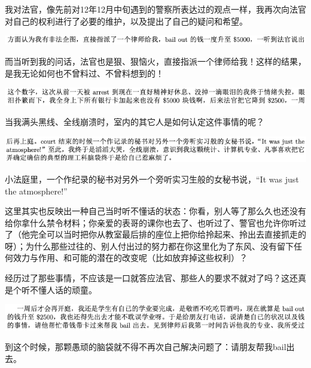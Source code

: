 \documentclass[9pt, b5paper]{article}
\begin{document}
我对法官，像先前对12年12月中旬遇到的警察所表达过的观点一样，我再次向法官对自己的权利进行了必要的维护，以及提出了自己的疑问和希望。

\begin{center}
\includegraphics[width=.9\linewidth]{./pic/backups_plans_20210506_084809.png}
\end{center}

而当听到我的问话，法官也是狠、狠恼火，直接指派一个律师给我！这样的结果，是我无论如何也不曾料过、不曾料想到的！

\begin{center}
\includegraphics[width=.9\linewidth]{./pic/backups_plans_20210506_084845.png}
\end{center}

当我满头黑线、全线崩溃时，室内的其它人是如何认定这件事情的呢？

\begin{center}
\includegraphics[width=.9\linewidth]{./pic/backups_plans_20210506_084919.png}
\end{center}

小法庭里，一个作纪录的秘书对另外一个旁听实习生般的女秘书说，“It was just the atmosphere!”

这里其实也反映出一种自己当时听不懂话的状态：你看，别人等了那么久也还没有给你拿什么禁令材料；你亲爱的表哥的课你也去了、也听过了、警官也允许你听过了（他完全可以当时把你从教室最后排的座位上把你给拎起来、拎出去直接抓走的呀）；为什么那些过往的、别人付出过的努力都在你这里化为了东风、没有留下任何效力与作用、和可能的潜在的改变呢（比如放弃掉这些权利）？

经历过了那些事情，不应该是一口就答应法官、那些人的要求不就对了吗？这还真是个听不懂人话的顽童。

\begin{center}
\includegraphics[width=.9\linewidth]{./pic/backups_plans_20210506_085736.png}
\end{center}

到这个时候，那颗愚顽的脑袋就不得不再次自己解决问题了：请朋友帮我bail出去。
\end{document}
